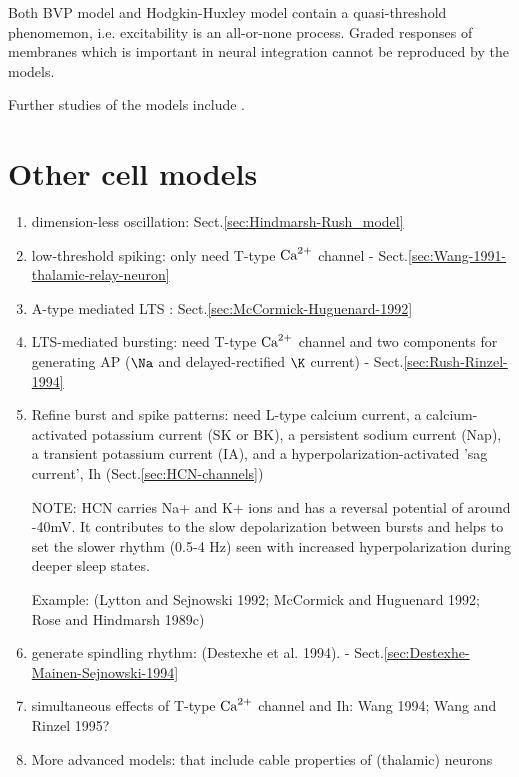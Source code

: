  Both BVP model and Hodgkin-Huxley model contain a quasi-threshold phenomemon,
 i.e. excitability is an all-or-none process. Graded
 responses of membranes which is important in neural integration cannot be
 reproduced by the models.
 
 Further studies of the models include \cite{kostova2004, faghih2010}.
 
\section{Other cell models}

\begin{enumerate}
 \item dimension-less oscillation: Sect.\ref{sec:Hindmarsh-Rush_model}
 
 \item low-threshold spiking: only need T-type ${\text{Ca}^{2+}}$ channel
 - Sect.\ref{sec:Wang-1991-thalamic-relay-neuron}
 
 \item A-type mediated LTS : Sect.\ref{sec:McCormick-Huguenard-1992}
 
 \item LTS-mediated bursting: need T-type ${\text{Ca}^{2+}}$ channel and two components for
 generating AP ($\Na$ and delayed-rectified $\K$ current) -
 Sect.\ref{sec:Rush-Rinzel-1994}

 \item Refine burst and spike patterns: 
 need L-type calcium current, a calcium-activated potassium current (SK or BK),
 a persistent sodium current (Nap), a transient potassium current (IA), and a
 hyperpolarization-activated 'sag current', Ih (Sect.\ref{sec:HCN-channels})
  
NOTE: HCN carries Na+ and K+ ions and has a reversal potential of around -40mV.
It contributes to the slow depolarization between bursts and helps to set the
slower rhythm (0.5-4 Hz) seen with increased hyperpolarization during deeper
sleep states.
  
 Example: (Lytton and Sejnowski 1992; McCormick and Huguenard 1992;
Rose and Hindmarsh 1989c) 

  \item generate spindling rhythm: (Destexhe et al. 1994). - Sect.\ref{sec:Destexhe-Mainen-Sejnowski-1994}

  \item simultaneous effects of T-type ${\text{Ca}^{2+}}$ channel and Ih: Wang 1994; Wang and
  Rinzel 1995?
  
  \item More advanced models: that include cable properties of (thalamic)
  neurons
\end{enumerate}


 

